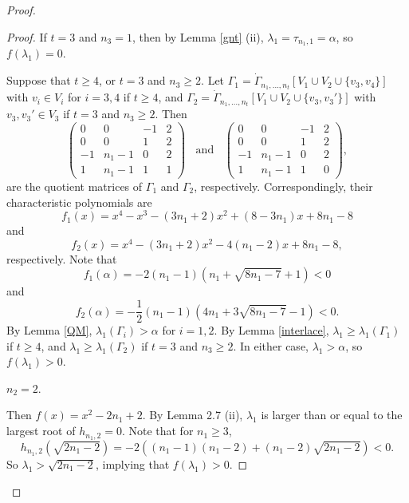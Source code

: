 \documentclass[12pt]{article}
\numberwithin{equation}{section}
\begin{document}
\begin{proof}
\begin{proof}
If $t=3$ and $n_3=1$, then by Lemma \ref{gnt} (ii), $\lambda_1=\tau_{n_1,1}=\alpha$, so $f(\lambda_1)=0$. 

Suppose that $t\ge 4$, or $t=3$ and $n_3\ge 2$. Let $\Gamma_1=\dot \Gamma_{n_1,\dots, n_t}[V_1\cup V_2\cup \{v_3, v_4\}]$ with $v_i\in V_i$ for $i=3,4$  if $t\ge 4$, and  $\Gamma_2=\dot \Gamma_{n_1,\dots, n_t}[V_1\cup V_2\cup \{v_3, v_3'\}]$ with $v_3, v_3'\in V_3$ if $t=3$ and $n_3\ge 2$. 
Then 
\[
\begin{pmatrix}
0 & 0 & -1 & 2 \\
0 & 0 & 1 & 2 \\
-1 & n_1-1 & 0 & 2 \\
1 & n_1-1 & 1 & 1 
\end{pmatrix}\ \ \ \ 
\text{and} \ \ \ \ 
\begin{pmatrix}
	0 & 0 & -1 & 2 \\
	0 & 0 & 1 & 2 \\
	-1 & n_1-1 & 0 & 2 \\
	1 & n_1-1 & 1 & 0 
\end{pmatrix},
\]
are the quotient matrices of $\Gamma_1$ and $\Gamma_2$, respectively.  Correspondingly, their characteristic polynomials are 
\[
f_1(x)=x^4-x^3-(3n_1+2)x^2+(8-3n_1)x+8n_1-8
\] 
and 
\[
f_2(x)=x^4-(3n_1+2)x^2-4(n_1-2)x+8n_1-8,
\]
respectively. 
Note that 
\[
f_1(\alpha)=-2(n_1-1)\left(n_1+\sqrt{8n_1-7}+1\right)<0
\]
and
\[
f_2(\alpha)=-\frac{1}{2}(n_1-1)\left(4n_1+3\sqrt{8n_1-7}-1\right)<0.
\]
By Lemma \ref{QM}, $\lambda_1(\Gamma_i)>\alpha$ for $i=1, 2$. 
By Lemma \ref{interlace},  $\lambda_1\ge \lambda_1(\Gamma_1)$ if $t\ge 4$, and 
 $\lambda_1\ge \lambda_1(\Gamma_2)$ if $t=3$ and $n_3\ge 2$. In either case,
 $\lambda_1>\alpha$,   so $f(\lambda_1)>0$. 


 $n_2=2$.

Then $f(x)=x^2-2n_1+2$.  By Lemma 2.7 (ii), $\lambda_1$ is larger than or equal to the largest root of 
$h_{n_1,2}=0$.
Note that for $n_1\ge 3$, 
\[
h_{n_1,2}\left(\sqrt{2n_1-2}\right)=-2\left((n_1-1)(n_1-2)+(n_1-2)\sqrt{2n_1-2}\right)<0. 
\]
So  $\lambda_1>\sqrt{2n_1-2}$, implying that $f(\lambda_1)>0$. 


\end{proof}
\end{proof}
\end{document}
